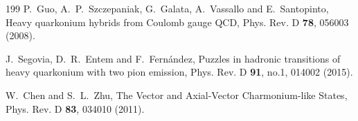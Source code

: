\documentclass[final,5p,times,twocolumn]{elsarticle}
\begin{document}
\begin{thebibliography}{199}
P.~Guo, A.~P.~Szczepaniak, G.~Galata, A.~Vassallo and E.~Santopinto,
Heavy quarkonium hybrids from Coulomb gauge QCD,
Phys. Rev. D \textbf{78}, 056003 (2008).


J.~Segovia, D.~R.~Entem and F.~Fern\'andez,
Puzzles in hadronic transitions of heavy quarkonium with two pion emission,
Phys. Rev. D \textbf{91}, no.1, 014002 (2015).


W.~Chen and S.~L.~Zhu,
The Vector and Axial-Vector Charmonium-like States,
Phys. Rev. D \textbf{83}, 034010 (2011).




\end{thebibliography}
\end{document}
